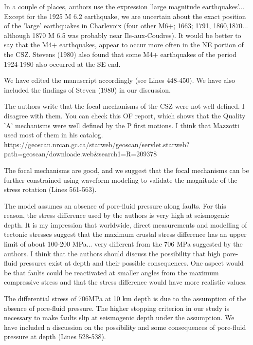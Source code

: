 \documentclass[12pt]{article}
\begin{document}
\begin{response}{In a couple of places, authors use the expression 'large magnitude earthquakes'... Except for the 1925 M 6.2 earthquake, we are uncertain about the exact position of the 'large' earthquakes in Charlevoix (four other M6+; 1663; 1791, 1860,1870... although 1870 M 6.5 was probably near Ile-aux-Coudres). It would be better to say that the M4+ earthquakes, appear to occur more often in the NE portion of the CSZ. Stevens (1980) also found that some M4+ earthquakes of the period 1924-1980 also occurred at the SE end.}

  We have edited the manuscript accordingly (see Lines 448-450). We have also included the findings of Steven (1980) in our discussion.
\end{response}

\begin{response}{The authors write that the focal mechanisms of the CSZ were not well defined. I disagree with them. You can check this OF report, which shows that the Quality 'A' mechanisms were well defined by the P first motions. I think that Mazzotti used most of them in his catalog.
https://geoscan.nrcan.gc.ca/starweb/geoscan/servlet.starweb?
path=geoscan/downloade.web&search1=R=209378}

 The focal mechanisms are good, and we suggest that the focal mechanisms can be further constrained using waveform modeling to validate the magnitude of the stress rotation (Lines 561-563).
\end{response}

\begin{response}{The model assumes an absence of pore-fluid pressure along faults. For this reason, the stress difference used by the authors is very high at seismogenic depth. It is my impression that worldwide, direct measurements and modelling of tectonic stresses suggest that the maximum crustal stress difference has an upper limit of about 100-200 MPa... very different from the 706 MPa suggested by the authors.
I think that the authors should discuss the possibility that high pore-fluid pressures exist at depth and their possible consequences. One aspect would be that faults could be reactivated at smaller angles from the maximum compressive stress and that the stress difference would have more realistic values.}

  The differential stress of 706MPa at 10 km depth is due to the assumption of the absence of pore-fluid pressure. The higher stopping criterion in our study is necessary to make faults slip at seismogenic depth under the assumption. We have included a discussion on the possibility and some consequences of pore-fluid pressure at depth (Lines 528-538).
\end{response}
\end{document}
